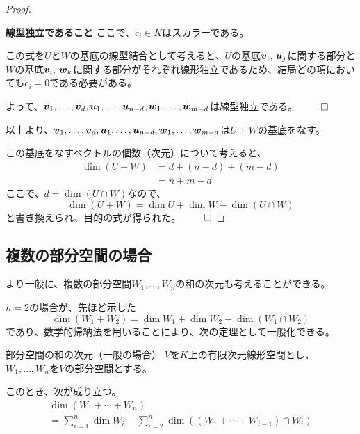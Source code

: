 \documentclass[../../../topic_linear-algebra]{subfiles}
\begin{document}
\begin{proof}
\begin{subpattern}{\bfseries 線型独立であること}
    ここで、$c_i \in K$はスカラーである。

    \br

    この式を$U$と$W$の基底の線型結合として考えると、$U$の基底$\vb*{v}_i, \, \vb*{u}_j$に関する部分と$W$の基底$\vb*{v}_i, \, \vb*{w}_k$に関する部分がそれぞれ線形独立であるため、結局どの項においても$c_i = 0$である必要がある。

    \br

    よって、$\vb*{v}_1, \dots, \vb*{v}_d, \vb*{u}_1, \dots, \vb*{u}_{n-d}, \vb*{w}_1, \dots, \vb*{w}_{m-d}$は線型独立である。 $\qed$
  \end{subpattern}

  \br

  以上より、$\vb*{v}_1, \dots, \vb*{v}_d, \vb*{u}_1, \dots, \vb*{u}_{n-d}, \vb*{w}_1, \dots, \vb*{w}_{m-d}$は$U + W$の基底をなす。

  \br

  この基底をなすベクトルの個数（次元）について考えると、
  \begin{align*}
    \dim(U + W) & = d + (n - d) + (m - d) \\
                & = n + m - d
  \end{align*}
  ここで、$d = \dim(U \cap W)$なので、
  \begin{equation*}
    \dim(U + W) = \dim U + \dim W - \dim(U \cap W)
  \end{equation*}
  と書き換えられ、目的の式が得られた。 $\qed$
\end{proof}

\subsection{複数の部分空間の場合}

より一般に、複数の部分空間$W_1, \ldots, W_n$の和の次元も考えることができる。

$n=2$の場合が、先ほど示した
\begin{equation*}
  \dim(W_1 + W_2) = \dim W_1 + \dim W_2 - \dim(W_1 \cap W_2)
\end{equation*}
であり、数学的帰納法を用いることにより、次の定理として一般化できる。

\begin{theorem*}{部分空間の和の次元（一般の場合）}
  $V$を$K$上の有限次元線形空間とし、$W_1, \ldots, W_n$を$V$の部分空間とする。

  このとき、次が成り立つ。
  \begin{multline*}
    \dim(W_1 + \cdots + W_n) \\
    = \sum_{i=1}^n \dim W_i - \sum_{i=2}^n \dim \left( (W_1 + \cdots + W_{i-1}) \cap W_i \right)
  \end{multline*}
\end{theorem*}
\end{document}
